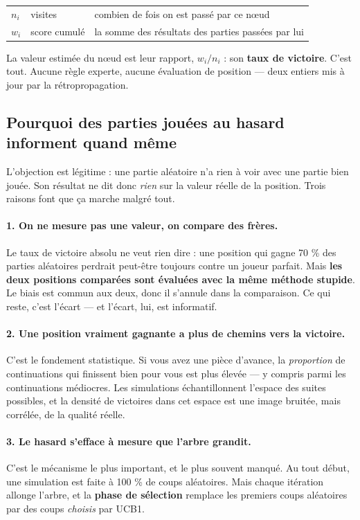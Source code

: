\begin{center}
\begin{tabular}{@{}llp{7.4cm}@{}}
\toprule
$n_i$ & visites & combien de fois on est passé par ce nœud \\
$w_i$ & score cumulé & la somme des résultats des parties passées par lui \\
\bottomrule
\end{tabular}
\end{center}

La valeur estimée du nœud est leur rapport, $w_i / n_i$ : son \textbf{taux de
victoire}. C'est tout. Aucune règle experte, aucune évaluation de position —
deux entiers mis à jour par la rétropropagation.

\subsection{Pourquoi des parties jouées au hasard informent quand même}

L'objection est légitime : une partie aléatoire n'a rien à voir avec une partie
bien jouée. Son résultat ne dit donc \emph{rien} sur la valeur réelle de la
position. Trois raisons font que ça marche malgré tout.

\paragraph{1. On ne mesure pas une valeur, on compare des frères.}
Le taux de victoire absolu ne veut rien dire : une position qui gagne 70 \% des
parties aléatoires perdrait peut-être toujours contre un joueur parfait. Mais
\textbf{les deux positions comparées sont évaluées avec la même méthode
stupide}. Le biais est commun aux deux, donc il s'annule dans la comparaison.
Ce qui reste, c'est l'écart — et l'écart, lui, est informatif.

\paragraph{2. Une position vraiment gagnante a plus de chemins vers la victoire.}
C'est le fondement statistique. Si vous avez une pièce d'avance, la
\emph{proportion} de continuations qui finissent bien pour vous est plus
élevée — y compris parmi les continuations médiocres. Les simulations
échantillonnent l'espace des suites possibles, et la densité de victoires dans
cet espace est une image bruitée, mais corrélée, de la qualité réelle.

\paragraph{3. Le hasard s'efface à mesure que l'arbre grandit.}
C'est le mécanisme le plus important, et le plus souvent manqué. Au tout début,
une simulation est faite à 100 \% de coups aléatoires. Mais chaque itération
allonge l'arbre, et la \textbf{phase de sélection} remplace les premiers coups
aléatoires par des coups \emph{choisis} par UCB1.

